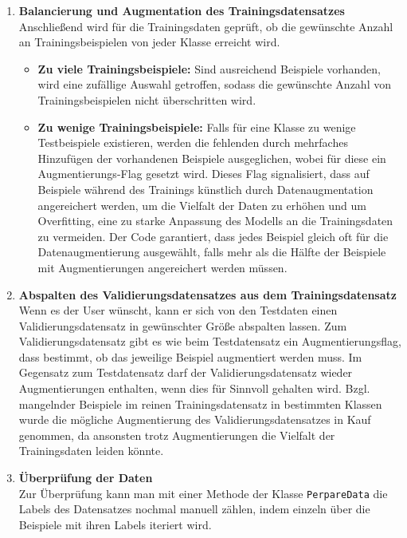 \documentclass[12pt,oneside]{article}
\begin{document}
\begin{enumerate}
			
				\item \textbf{Balancierung und Augmentation des Trainingsdatensatzes} \\
				Anschließend wird für die Trainingsdaten geprüft, ob die gewünschte Anzahl an Trainingsbeispielen von jeder Klasse erreicht wird.
				\begin{itemize}
					\item \textbf{Zu viele Trainingsbeispiele:} Sind ausreichend Beispiele vorhanden, wird eine zufällige Auswahl getroffen, sodass die gewünschte Anzahl von Trainingsbeispielen nicht überschritten wird.
					\item \textbf{Zu wenige Trainingsbeispiele:}  Falls für eine Klasse zu wenige Testbeispiele existieren, werden die fehlenden durch mehrfaches Hinzufügen der vorhandenen Beispiele ausgeglichen, wobei für diese ein Augmentierungs-Flag gesetzt wird. Dieses Flag signalisiert, dass auf Beispiele während des Trainings künstlich durch Datenaugmentation angereichert werden, um die Vielfalt der Daten zu erhöhen und um Overfitting, eine zu starke Anpassung des Modells an die Trainingsdaten zu vermeiden. Der Code garantiert, dass jedes Beispiel gleich oft für die Datenaugmentierung ausgewählt, falls mehr als die Hälfte der Beispiele mit Augmentierungen angereichert werden müssen.
				\end{itemize}
				
				
				\item \textbf{Abspalten des Validierungsdatensatzes aus dem Trainingsdatensatz} \\
				Wenn es der User wünscht, kann er sich von den Testdaten einen Validierungsdatensatz in gewünschter Größe abspalten lassen. Zum Validierungsdatensatz gibt es wie beim Testdatensatz ein Augmentierungsflag, dass bestimmt, ob das jeweilige Beispiel augmentiert werden muss. Im Gegensatz zum Testdatensatz darf der Validierungsdatensatz wieder Augmentierungen enthalten, wenn dies für Sinnvoll gehalten wird. Bzgl. mangelnder Beispiele im reinen Trainingsdatensatz in bestimmten Klassen wurde die mögliche Augmentierung des Validierungsdatensatzes in Kauf genommen, da ansonsten trotz Augmentierungen die Vielfalt der Trainingsdaten leiden könnte.
			
				\item \textbf{Überprüfung der Daten} \\
				Zur Überprüfung kann man mit einer Methode der Klasse \texttt{PerpareData} die Labels des Datensatzes nochmal manuell zählen, indem einzeln über die Beispiele mit ihren Labels iteriert wird. \\
	
			\end{enumerate}
			
\end{document}
